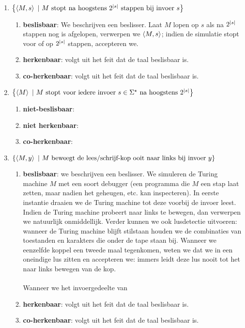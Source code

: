 \documentclass{article}
\begin{document}
\begin{question}[Berekenbaarheid]
\begin{answer}
\begin{enumerate}
\begin{enumerate}
 \end{enumerate}
 \item $\left\{ \left\langle M,s \right\rangle\ |\ \mbox{$M$ stopt na hoogstens $2^{\left|s\right|}$ stappen bij invoer $s$} \right\}$
 \begin{enumerate}
  \item \textbf{beslisbaar}: We beschrijven een beslisser. Laat $M$ lopen op $s$ als na $2^{\left|s\right|}$ stappen nog is afgelopen, verwerpen we $\left\langle M,s \right\rangle$; indien de simulatie stopt voor of op $2^{\left|s\right|}$ stappen, accepteren we.
  \item \textbf{herkenbaar}: volgt uit het feit dat de taal beslisbaar is.
  \item \textbf{co-herkenbaar}: volgt uit het feit dat de taal beslisbaar is.
 \end{enumerate}
 \item $\left\{ \left\langle M \right\rangle\ |\ \mbox{$M$ stopt voor iedere invoer $s\in\Sigma^{\star}$ na hoogstens $2^{\left|s\right|}$} \right\}$
 \begin{enumerate}
  \item \textbf{niet-beslisbaar}: 
  \item \textbf{niet herkenbaar}: 
  \item \textbf{co-herkenbaar}: 
 \end{enumerate}
 \item $\left\{ \left\langle M,y \right\rangle\ |\ \mbox{$M$ beweegt de lees/schrijf-kop ooit naar links bij invoer $y$} \right\}$
 \begin{enumerate}
  \item \textbf{beslisbaar}: we beschrijven een beslisser. We simuleren de Turing machine $M$ met een soort debugger (een programma die $M$ een stap laat zetten, maar nadien het geheugen, etc. kan inspecteren). In eerste instantie draaien we de Turing machine tot deze voorbij de invoer leest. Indien de Turing machine probeert naar links te bewegen, dan verwerpen we natuurlijk onmiddellijk. Verder kunnen we ook lusdetectie uitvoeren: wanneer de Turing machine blijft stilstaan houden we de combinaties van toestanden en karakters die onder de tape staan bij. Wanneer we eenzelfde koppel een tweede maal tegenkomen, weten we dat we in een oneindige lus zitten en accepteren we: immers leidt deze lus nooit tot het naar links bewegen van de kop.
  \paragraph{}
  Wanneer we het invoergedeelte van 
  \item \textbf{herkenbaar}: volgt uit het feit dat de taal beslisbaar is.
  \item \textbf{co-herkenbaar}: volgt uit het feit dat de taal beslisbaar is.
 \end{enumerate}
\end{enumerate}
\end{answer}
\end{question}
\end{document}
